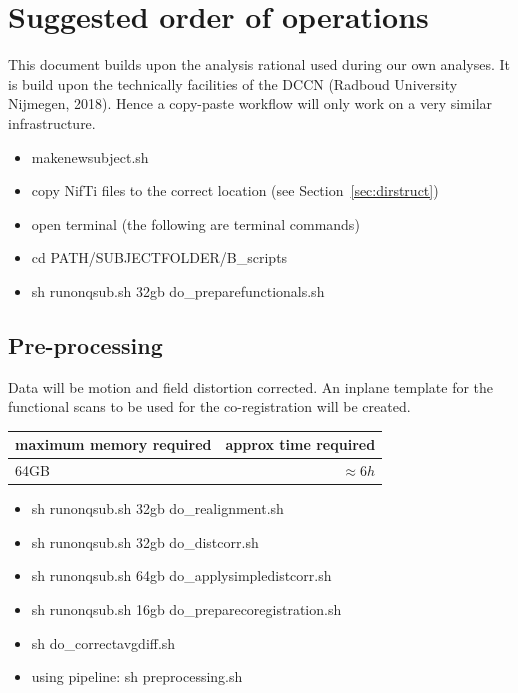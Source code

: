 \documentclass[12pt,a4paper]{scrartcl}
\begin{document}
\section{Suggested order of operations}
This document builds upon the analysis rational used during our own analyses. It is build upon the technically facilities of the DCCN (Radboud University Nijmegen, 2018). Hence a copy-paste workflow will only work on a very similar infrastructure.
\begin{itemize}
\item makenewsubject.sh
\item copy NifTi files to the correct location (see Section~\ref{sec:dirstruct})
\item open terminal (the following are terminal commands)
\item cd PATH/SUBJECTFOLDER/B\_scripts
\item sh runonqsub.sh 32gb do\_preparefunctionals.sh
\end{itemize}
\subsection{Pre-processing}
Data will be motion and field distortion corrected. An inplane template for the functional scans to be used for the co-registration  will be created.
\begin{table}[h]
\begin{tabular}{l | r}
\toprule
maximum memory required & approx time required\\\toprule
64GB & $\approx 6h$ \\\bottomrule
\end{tabular}
\end{table}
\begin{itemize}
\item sh runonqsub.sh 32gb do\_realignment.sh
\item sh runonqsub.sh 32gb do\_distcorr.sh
\item sh runonqsub.sh 64gb do\_applysimpledistcorr.sh
\item sh runonqsub.sh 16gb do\_preparecoregistration.sh
\item sh do\_correctavgdiff.sh
\item using pipeline: sh preprocessing.sh
\end{itemize}
\end{document}
